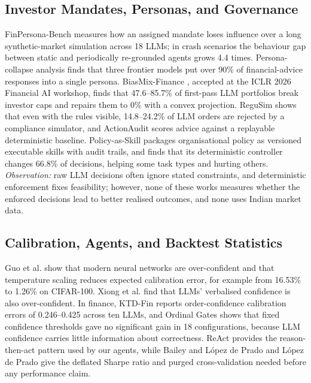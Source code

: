 \subsection{Investor Mandates, Personas, and Governance}
FinPersona-Bench \cite{finpersona} measures how an assigned mandate loses influence over a long synthetic-market simulation across 18 LLMs; in crash scenarios the behaviour gap between static and periodically re-grounded agents grows 4.4 times. Persona-collapse analysis \cite{personacollapse} finds that three frontier models put over 90\% of financial-advice responses into a single persona. BiasMix-Finance \cite{biasmix}, accepted at the ICLR 2026 Financial AI workshop, finds that 47.6--85.7\% of first-pass LLM portfolios break investor caps and repairs them to 0\% with a convex projection. ReguSim \cite{regusim} shows that even with the rules visible, 14.8--24.2\% of LLM orders are rejected by a compliance simulator, and ActionAudit \cite{actionaudit} scores advice against a replayable deterministic baseline. Policy-as-Skill \cite{policyasskill} packages organisational policy as versioned executable skills with audit trails, and finds that its deterministic controller changes 66.8\% of decisions, helping some task types and hurting others. \emph{Observation:} raw LLM decisions often ignore stated constraints, and deterministic enforcement fixes feasibility; however, none of these works measures whether the enforced decisions lead to better realised outcomes, and none uses Indian market data.

\subsection{Calibration, Agents, and Backtest Statistics}
Guo et al. \cite{guo2017calibration} show that modern neural networks are over-confident and that temperature scaling reduces expected calibration error, for example from 16.53\% to 1.26\% on CIFAR-100. Xiong et al. \cite{xiong2024confidence} find that LLMs' verbalised confidence is also over-confident. In finance, KTD-Fin \cite{ktdfin} reports order-confidence calibration errors of 0.246--0.425 across ten LLMs, and Ordinal Gates \cite{ordinalgates} shows that fixed confidence thresholds gave no significant gain in 18 configurations, because LLM confidence carries little information about correctness. ReAct \cite{react} provides the reason-then-act pattern used by our agents, while Bailey and L\'opez de Prado \cite{bailey2014deflated} and L\'opez de Prado \cite{lopezdeprado2018} give the deflated Sharpe ratio and purged cross-validation needed before any performance claim.

